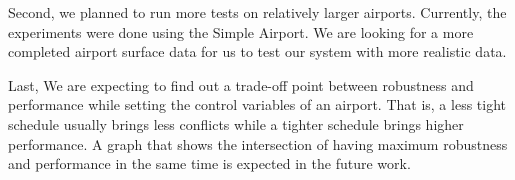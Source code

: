 \documentclass[conference]{IEEEtran}
\begin{document}
Second, we planned to run more tests on relatively larger airports. Currently, the experiments were done using the Simple Airport. We are looking for a more completed airport surface data for us to test our system with more realistic data.

Last, We are expecting to find out a trade-off point between robustness and performance while setting the control variables of an airport. That is, a less tight schedule usually brings less conflicts while a tighter schedule brings higher performance. A graph that shows the intersection of having maximum robustness and performance in the same time is expected in the future work.


%
%



%
%
\end{document}
